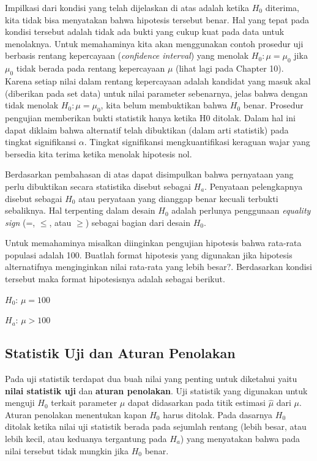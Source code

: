 \documentclass[]{book}
\begin{document}
Impilkasi dari kondisi yang telah dijelaskan di atas adalah ketika
\(H_0\) diterima, kita tidak bisa menyatakan bahwa hipotesis tersebut
benar. Hal yang tepat pada kondisi tersebut adalah tidak ada bukti yang
cukup kuat pada data untuk menolaknya. Untuk memahaminya kita akan
menggunakan contoh prosedur uji berbasis rentang kepercayaan
(\emph{confidence interval}) yang menolak \(H_0:\mu=\mu_0\) jika
\(\mu_0\) tidak berada pada rentang kepercayaan \(\mu\) (lihat lagi pada
Chapter 10). Karena setiap nilai dalam rentang kepercayaan adalah
kandidat yang masuk akal (diberikan pada set data) untuk nilai parameter
sebenarnya, jelas bahwa dengan tidak menolak \(H_0:\mu=\mu_0\), kita
belum membuktikan bahwa \(H_0\) benar. Prosedur pengujian memberikan
bukti statistik hanya ketika H0 ditolak. Dalam hal ini dapat diklaim
bahwa alternatif telah dibuktikan (dalam arti statistik) pada tingkat
signifikansi \(\alpha\). Tingkat signifikansi mengkuantifikasi keraguan
wajar yang bersedia kita terima ketika menolak hipotesis nol.

Berdasarkan pembahasan di atas dapat disimpulkan bahwa pernyataan yang
perlu dibuktikan secara statistika disebut sebagai \(H_a\). Penyataan
pelengkapnya disebut sebagai \(H_0\) atau peryataan yang dianggap benar
kecuali terbukti sebaliknya. Hal terpenting dalam desain \(H_0\) adalah
perlunya penggunaan \emph{equality sign} (=, \(\le\), atau \(\ge\))
sebagai bagian dari desain \(H_0\).

Untuk memahaminya misalkan diinginkan pengujian hipotesis bahwa
rata-rata populasi adalah 100. Buatlah format hipotesis yang digunakan
jika hipotesis alternatifnya menginginkan nilai rata-rata yang lebih
besar?. Berdasarkan kondisi tersebut maka format hipotesisnya adalah
sebagai berikut.

\textbf{\(H_0\)}: \(\mu=100\)

\textbf{\(H_a\)}: \(\mu > 100\)

\subsection{Statistik Uji dan Aturan
Penolakan}\label{statistik-uji-dan-aturan-penolakan}

Pada uji statistik terdapat dua buah nilai yang penting untuk diketahui
yaitu \textbf{nilai statistik uji} dan \textbf{aturan penolakan}. Uji
statistik yang digunakan untuk menguji \(H_0\) terkait parameter \(\mu\)
dapat didasarkan pada titik estimasi \(\hat\mu\) dari \(\mu\). Aturan
penolakan menentukan kapan \(H_0\) harus ditolak. Pada dasarnya \(H_0\)
ditolak ketika nilai uji statistik berada pada sejumlah rentang (lebih
besar, atau lebih kecil, atau keduanya tergantung pada \(H_a\)) yang
menyatakan bahwa pada nilai tersebut tidak mungkin jika \(H_0\) benar.
\end{document}

